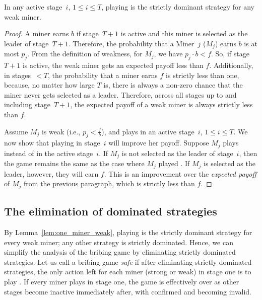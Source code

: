 \begin{lemma}
\label{lem:one_miner_weak}
  In any active stage~$i$, $1\leq i \leq T$, playing  is the strictly dominant strategy for any weak miner.
\end{lemma}
\begin{proof}
    A miner earns $b$ if stage~$T+1$ is active and this miner is selected as the leader of stage~$T+1$. Therefore, the probability that a Miner~$j$ ($M_j$) earns $b$ is at most $p_j$. From the definition of weakness, for $M_j$, we have $p_j \cdot b<f$. So, if stage~$T+1$ is active, the weak miner gets an expected payoff less than $f$. Additionally, in stages~$<T$, the probability that a miner earns $f$ is strictly less than one, because, no matter how large $T$ is, there is always a non-zero chance that the miner never gets selected as a leader. Therefore, across all stages up to and including stage~$T+1$, the expected payoff of a weak miner is always strictly less than $f$. 
    
    Assume $M_j$ is weak (i.e., $p_j<\frac{f}{b}$), and plays \follow{} in an active stage~$i$, $1\leq i \leq T$. We now show that playing  in stage~$i$ will improve her payoff. Suppose $M_j$ plays  instead of \follow{} in the active stage~$i$. If $M_j$ is not selected as the leader of stage~$i$, then the game remains the same as the case where $M_j$ played \follow{}. If $M_j$ is selected as the leader, however, they will earn $f$. This is an improvement over the \emph{expected payoff} of $M_j$ from the previous paragraph, which is strictly less than $f$.
 
\end{proof} 

\subsection{The elimination of dominated strategies} \label{ss:iterated_elimination_of_dominated_strategies} 
By Lemma~\ref{lem:one_miner_weak}, playing  is the strictly dominant strategy for every weak miner; any other strategy is strictly dominated. Hence, we can simplify the analysis of the bribing game by eliminating strictly dominated strategies. Let us call a bribing game \emph{safe} if after eliminating strictly dominated strategies, the only action left for each miner (strong or weak) in stage one is to play . If every miner plays  in stage one, the game is effectively over as other stages become inactive immediately after, with \sellertxn{} confirmed and \bribetxn{} becoming invalid.

